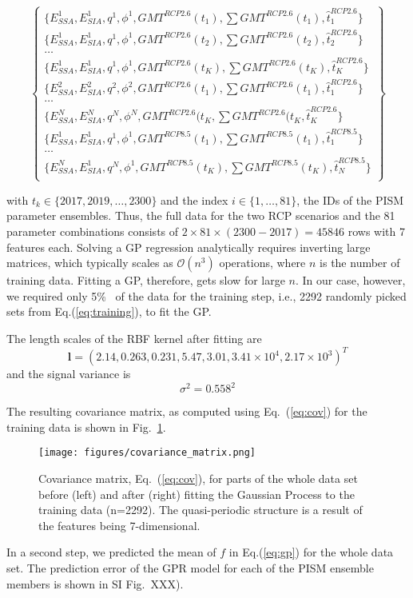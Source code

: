 \documentclass[12pt,a4paper]{article}
\begin{document}
\begin{equation}
\begin{Bmatrix}
\{E_{SSA}^1,E_{SIA}^1,q^1,\phi^1,GMT^{RCP2.6}(t_1),\sum GMT^{RCP2.6}(t_1),\hat{t}^{RCP2.6}_1\} \\
\{E_{SSA}^1,E_{SIA}^1,q^1,\phi^1,GMT^{RCP2.6}(t_2),\sum GMT^{RCP2.6}(t_2),\hat{t}^{RCP2.6}_2\} \\
\ldots \\
\{E_{SSA}^1,E_{SIA}^1,q^1,\phi^1,GMT^{RCP2.6}(t_K),\sum GMT^{RCP2.6}(t_K),\hat{t}^{RCP2.6}_K\} \\
\{E_{SSA}^2,E_{SIA}^2,q^2,\phi^2,GMT^{RCP2.6}(t_1),\sum GMT^{RCP2.6}(t_1),\hat{t}^{RCP2.6}_1\} \\
\ldots \\
\{E_{SSA}^N,E_{SIA}^N,q^N,\phi^N,GMT^{RCP2.6}(t_K,\sum GMT^{RCP2.6}(t_K,\hat{t}^{RCP2.6}_K\} \\
\{E_{SSA}^1,E_{SIA}^1,q^1,\phi^1,GMT^{RCP8.5}(t_1),\sum GMT^{RCP8.5}(t_1),\hat{t}^{RCP8.5}_1\} \\
\ldots \\
\{E_{SSA}^N,E_{SIA}^1,q^N,\phi^1,GMT^{RCP8.5}(t_K),\sum GMT^{RCP8.5}(t_K),\hat{t}^{RCP8.5}_N\} \\
\end{Bmatrix}
\label{eq:training}
\end{equation}

with $t_k \in \{2017,2019,\ldots,2300\}$ and the index $i \in \{1,\ldots,81\}$, the IDs of the PISM parameter ensembles.
Thus, the full data for the two RCP scenarios and the 81 parameter combinations consists of $2\times81\times(2300-2017)=45846$ rows with 7 features each.
Solving a GP regression analytically requires inverting large matrices, which typically scales as $\mathcal{O}(n^3)$ operations, where $n$ is the number of training data.
Fitting a GP, therefore, gets slow for large $n$.
In our case, however, we required only 5\%~ of the data for the training step, i.e., 2292 randomly picked sets from Eq.(\ref{eq:training}), to fit the GP.

The length scales of the RBF kernel after fitting are
\begin{equation*}
\mathbf{l} = \left(2.14, 0.263, 0.231, 5.47, 3.01, 3.41\times10^4, 2.17\times10^3\right)^T
\end{equation*}
and the signal variance is
\begin{equation*}
\sigma^2 = 0.558^2
\end{equation*}

The resulting covariance matrix, as computed using Eq.~(\ref{eq:cov}) for the training data  is shown in Fig.~\ref{fig:cov}.

\begin{figure}
\texttt{[image: figures/covariance\_matrix.png]} 
\caption{Covariance matrix, Eq.~(\ref{eq:cov}), for parts of the whole data set before (left) and after (right) fitting the Gaussian Process to the training data (n=2292). The quasi-periodic structure is a result of the features being 7-dimensional.}
\label{fig:cov}
\end{figure}

In a second step, we predicted the mean of $f$ in Eq.(\ref{eq:gp}) for the whole data set.
The prediction error of the GPR model for each of the PISM ensemble members is shown in SI Fig.~XXX).
\end{document}

